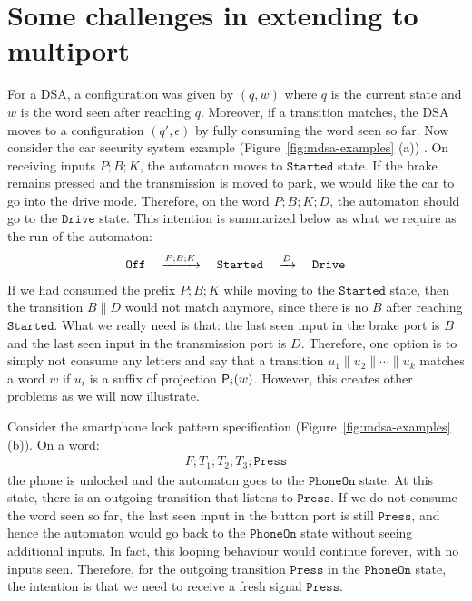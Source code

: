 \section{Some challenges in extending to multiport}
\label{sec:challenges}

For a DSA, a configuration was given by $(q, w)$ where $q$ is the current state and $w$ is the word seen after reaching $q$. Moreover, if a transition matches, the DSA moves to a configuration $(q', \epsilon)$ by fully consuming the word seen so far. Now consider the car security system example (Figure~\ref{fig:mdsa-examples} (a)) . On receiving inputs $P;B;K$, the automaton moves to $\mathtt{Started}$ state.
If the brake remains pressed and the transmission is moved to park, we would like the car to go into the drive mode. Therefore, on the word $P;B;K;D$, the automaton should go to the $\mathtt{Drive}$ state. This intention is summarized below as what we require as the run of the automaton:
\begin{align*}
  \mathtt{Off} \quad \xrightarrow{P;B;K} \quad \mathtt{Started} \quad \xrightarrow{D} \quad \mathtt{Drive}
  \end{align*} 
 If we had consumed the prefix $P;B;K$ while moving to the $\mathtt{Started}$ state, then the transition $B \parallel D$ would not match anymore, since there is no $B$ after reaching $\mathtt{Started}$. What we really need is that: the last seen input in the brake port is $B$ and the last seen input in the transmission port is $D$. Therefore, one option is to simply not consume any letters and say that a transition $u_1 \parallel u_2 \parallel \cdots \parallel u_k$ matches a word $w$ if $u_i$ is a suffix of projection $\mathsf{P}_{i}(w)$. However, this creates other problems as we will now illustrate. 
 
 Consider the smartphone lock pattern specification (Figure~\ref{fig:mdsa-examples} (b)). On a word:
 \begin{align*} 
 F; T_1; T_2; T_3; \mathtt{Press}
 \end{align*} 
 the phone is unlocked and the automaton goes to the $\mathtt{PhoneOn}$ state. At this state, there is an outgoing transition that listens to $\mathtt{Press}$. If we do not consume the word seen so far, the last seen input in the button port is still $\mathtt{Press}$, and hence the automaton would go back to the $\mathtt{PhoneOn}$ state without seeing additional inputs. In fact, this looping behaviour would continue forever, with no inputs seen. Therefore, for the outgoing transition $\mathtt{Press}$ in the $\mathtt{PhoneOn}$ state, the intention is that we need to receive a fresh signal $\mathtt{Press}$.  
 
